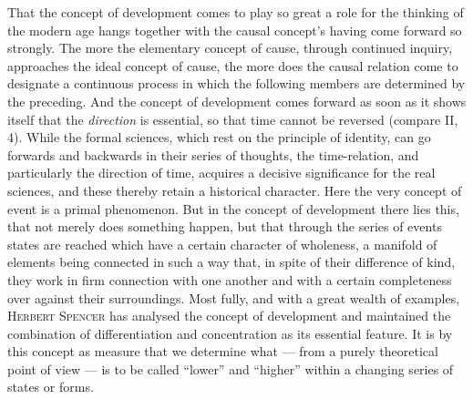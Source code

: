 \documentclass[12pt,a4paper]{book}
\begin{document}
That the concept of development comes to play so great a role for the thinking of
the modern age hangs together with the causal concept's having come forward so
strongly. The more the elementary concept of cause, through continued inquiry,
approaches the ideal concept of cause, the more does the causal relation come to
designate a continuous process in which the following members are determined by
the preceding. And the concept of development comes forward as soon as it shows
itself that the \emph{direction} is essential, so that time cannot be reversed
(compare II, 4). While the formal sciences, which rest on the principle of
identity, can go forwards and backwards in their series of thoughts, the
time-relation, and particularly the direction of time, acquires a decisive
significance for the real sciences, and these thereby retain a historical
character. Here the very concept of event is a primal phenomenon. But in the
concept of development there lies this, that not merely does something happen,
but that through the series of events states are reached which have a certain
character of wholeness, a manifold of elements being connected in such a way
that, in spite of their difference of kind, they work in firm connection with one
another and with a certain completeness over against their surroundings. Most
fully, and with a great wealth of examples, \textsc{Herbert Spencer} has analysed
the concept of development and maintained the combination of differentiation and
concentration as its essential feature. It is by this concept as measure that we
determine what --- from a purely theoretical point of view --- is to be called
``lower'' and ``higher'' within a changing series of states or forms.
\end{document}
